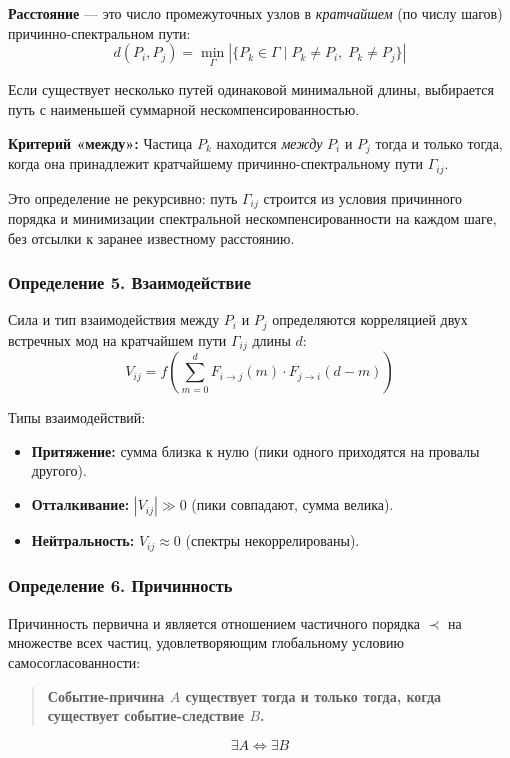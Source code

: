 \documentclass[12pt,a4paper]{article}
\begin{document}
\textbf{Расстояние} --- это число промежуточных узлов в \textit{кратчайшем} (по числу шагов) причинно-спектральном пути:
\begin{equation}
    \boxed{d(P_i, P_j) = \min_{\Gamma} |\{P_k \in \Gamma \mid P_k \neq P_i,\; P_k \neq P_j\}|}
\end{equation}

Если существует несколько путей одинаковой минимальной длины, выбирается путь с наименьшей суммарной нескомпенсированностью.

\textbf{Критерий «между»:} Частица $P_k$ находится \textit{между} $P_i$ и $P_j$ тогда и только тогда, когда она принадлежит кратчайшему причинно-спектральному пути $\Gamma_{ij}$.

Это определение не рекурсивно: путь $\Gamma_{ij}$ строится из условия причинного порядка и минимизации спектральной нескомпенсированности на каждом шаге, без отсылки к заранее известному расстоянию.

\subsubsection{Определение 5. Взаимодействие}
Сила и тип взаимодействия между $P_i$ и $P_j$ определяются корреляцией двух встречных мод на кратчайшем пути $\Gamma_{ij}$ длины $d$:
\begin{equation}
    V_{ij} = f\left( \sum_{m=0}^{d} F_{i \to j}(m) \cdot F_{j \to i}(d-m) \right)
\end{equation}

Типы взаимодействий:
\begin{itemize}
    \item \textbf{Притяжение:} сумма близка к нулю (пики одного приходятся на провалы другого).
    \item \textbf{Отталкивание:} $|V_{ij}| \gg 0$ (пики совпадают, сумма велика).
    \item \textbf{Нейтральность:} $V_{ij} \approx 0$ (спектры некоррелированы).
\end{itemize}

\subsubsection{Определение 6. Причинность}
Причинность первична и является отношением частичного порядка $\prec$ на множестве всех частиц, удовлетворяющим глобальному условию самосогласованности:

\begin{quote}
\textbf{Событие-причина $A$ существует тогда и только тогда, когда существует событие-следствие $B$.}
\end{quote}
\begin{equation}
    \exists A \iff \exists B
\end{equation}
\end{document}
